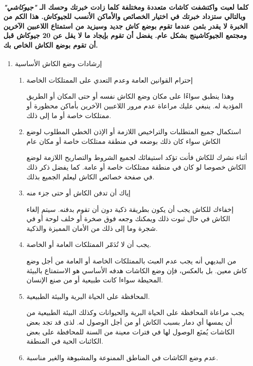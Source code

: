 \documentclass[12pt,a4paper,onecolumn,notitlepage]{book}
\begin{document}
\paragraph{كلما لعبت واكتشفت كاشات متعددة ومختلفة كلما زادت خبرتك وحسك الـ \emph{"جيوكاشي"} وبالتالي ستزداد خبرتك في اختيار الخصائص والأماكن الأنسب للجيوكاش. هذا الكم من الخبرة لا يقدر بثمن عندما تقوم بوضع كاش جديد وسيزيد من استمتاع اللاعبين الآخرين ومجتمع الجيوكاشينج بشكل عام. يفضل أن تقوم بإيجاد ما لا يقل عن \textbf{20 جيوكاش} قبل أن تقوم بوضع الكاش الخاص بك.}

\begin{enumerate}
\item إرشادات وضع الكاش الأساسية
\begin{enumerate}[
rightmargin=0pt, itemindent=20pt,
labelwidth=15pt, labelsep=5pt, listparindent=0.7cm,
align=right]
\item إحترام القوانين العامة وعدم التعدي على الممتلكات الخاصة

وهذا ينطبق سواءًا على مكان وضع الكاش نفسه أو حتى المكان أو الطريق المؤدية له. ينبغي عليك مراعاة عدم مرور اللاعبين الآخرين بأماكن محظورة أو ممتلكات خاصة أو ما إلى ذلك.
\item استكمال جميع المتطلبات والتراخيص اللازمة أو الإذن الخطي المطلوب لوضع الكاش سواء كان ذلك بوضعه في منطقة ممتلكات خاصة أو مكان عام

أثناء نشرك للكاش فأنت تؤكد استيفائك لجميع الشروط والتصاريح اللازمة لوضع الكاش خصوصا لو كان في منطقة ممتلكات خاصة أو عامة. كما يفضل ذكر ذلك في صفحة خصائص الكاش ليعلم الجميع بذلك. 
\item إياك أن تدفن الكاش أو حتى جزء منه

إخفاءك للكاش يجب أن يكون بطريقة ذكية دون أن تقوم بدفنه. سيتم إلغاء الكاش في حال ثبوت ذلك ويمكنك وجعه فوق صخرة أو خلف لوحة أو في شجرة وما إلى ذلك من الأمان المميزة والذكية.
\item يجب أن لا تُدَمّر الممتلكات العامة أو الخاصة.

من البديهي أنه يجب عدم العبث بالممتلكات الخاصة أو العامة من أجل وضع كاش معين. بل بالعكس، فإن وضع الكاشات هدفه الأساسي هو الاستمتاع بالبيئة المحيطة سواءا كانت طبيعية أو من صنع الإنسان.
\item المحافظة على الحياة البرية والبيئة الطبيعية.

يجب مراعاة المحافظة على الحياة البرية والحيوانات وكذلك البيئة الطبيعية من أن يمسها أي دمار بسبب الكاش أو من أجل الوصول له. لذى قد تجد بعض الكاشات يُمنَع الوصول لها في فترات معينة من السنة للمحافظة على بعض الكائنات الحية في المنطقة.
\item عدم وضع الكاشات في المناطق الممنوعة والمشبوهة والغير مناسبة.


\end{enumerate}
\end{enumerate}
\end{document}
